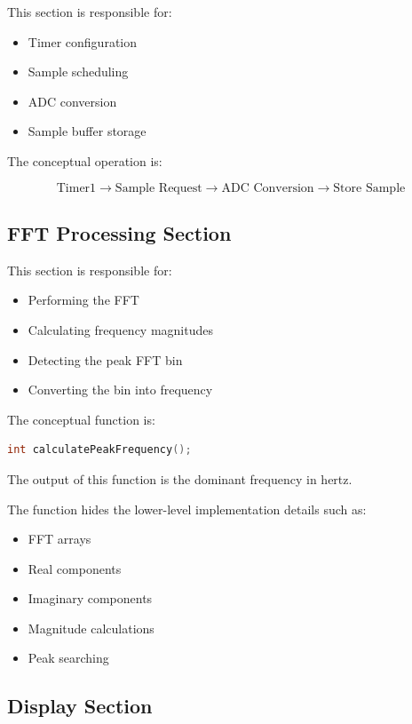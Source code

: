 \documentclass{article}
\begin{document}
\begin{center}
This section is responsible for:

\begin{itemize}
    \item Timer configuration
    \item Sample scheduling
    \item ADC conversion
    \item Sample buffer storage
\end{itemize}

The conceptual operation is:

\[
\text{Timer1}
\rightarrow
\text{Sample Request}
\rightarrow
\text{ADC Conversion}
\rightarrow
\text{Store Sample}
\]

\subsection{FFT Processing Section}

This section is responsible for:

\begin{itemize}
    \item Performing the FFT
    \item Calculating frequency magnitudes
    \item Detecting the peak FFT bin
    \item Converting the bin into frequency
\end{itemize}

The conceptual function is:

\begin{lstlisting}[language=C++]
int calculatePeakFrequency();
\end{lstlisting}

The output of this function is the dominant frequency in hertz.

The function hides the lower-level implementation details such as:

\begin{itemize}
    \item FFT arrays
    \item Real components
    \item Imaginary components
    \item Magnitude calculations
    \item Peak searching
\end{itemize}

\subsection{Display Section}


\end{center}
\end{document}
